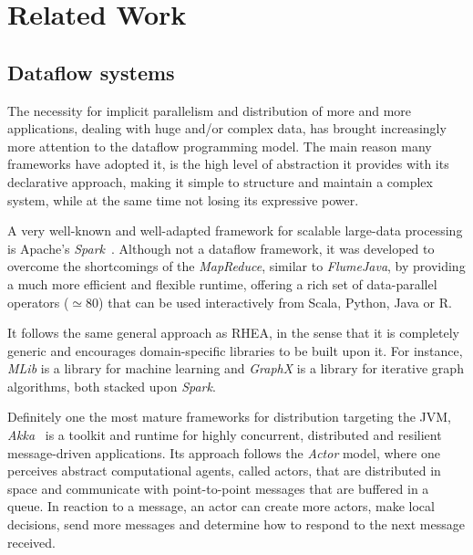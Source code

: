 \documentclass[sigplan,screen]{acmart}
\begin{document}
\section{Related Work} \label{sec:related}

\subsection{Dataflow systems}

The necessity for implicit parallelism and distribution of more and more
applications, dealing with huge and/or complex data, has brought increasingly
more attention to the dataflow programming model. The main reason many
frameworks have adopted it, is the high level of abstraction it provides with
its declarative approach, making it simple to structure and maintain a complex
system, while at the same time not losing its expressive power.

A very well-known and well-adapted framework for scalable large-data processing
is Apache's \textit{Spark}~\cite{spark}. Although not a
dataflow framework, it was developed to overcome the shortcomings of the
\textit{MapReduce}, similar to \textit{FlumeJava}, by providing a much more
efficient and flexible runtime, offering a rich set of data-parallel operators ($\simeq 80$)
that can be used interactively from Scala, Python, Java or R.

It follows the same general approach as \textsc{RHEA}, in the sense that it is
completely generic and encourages domain-specific libraries to be built upon it.
For instance, \textit{MLib} is a library for machine learning and
\textit{GraphX} is a library for iterative graph algorithms, both stacked upon
\textit{Spark}.

Definitely one the most mature frameworks for distribution targeting the JVM,
\textit{Akka}~ is a toolkit and runtime for highly
concurrent, distributed and resilient message-driven applications.
Its approach follows the \textit{Actor} model, where one perceives
abstract computational agents, called actors, that are distributed in space and
communicate with point-to-point messages that are buffered in a queue. In
reaction to a message, an actor can create more actors, make local decisions,
send more messages and determine how to respond to the next message received.
\end{document}
